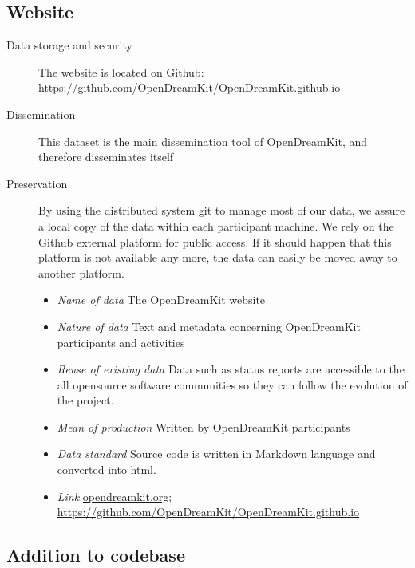 \documentclass{deliverablereport}
\begin{document}
\subsection{Website}

\begin{description}
\item[Data storage and security] The website is located on Github: \href{https://github.com/OpenDreamKit/OpenDreamKit.github.io}{https://github.com/OpenDreamKit/OpenDreamKit.github.io}
\item[Dissemination] This dataset is the main dissemination tool of OpenDreamKit, and therefore disseminates itself
\item[Preservation] By using the distributed system git to manage most of our data, we assure a local copy of the data within each participant machine. We rely on the Github external platform for public access. If it should happen that this platform is not available any more, the data can easily be moved away to another platform.
\begin{itemize}
\item\textit{Name of data} The OpenDreamKit website
\item\textit{Nature of data} Text and metadata concerning OpenDreamKit participants and activities
\item\textit{Reuse of existing data} Data such as status reports are accessible to the all opensource software communities so they can follow the evolution of the project. 
\item\textit{Mean of production} Written by OpenDreamKit participants
\item\textit{Data standard} Source code is written in Markdown language and converted into html.
\item\textit{Link} \href{http://opendreamkit.org/}{opendreamkit.org}; \href{https://github.com/OpenDreamKit/OpenDreamKit.github.io}{https://github.com/OpenDreamKit/OpenDreamKit.github.io}
\end{itemize}
\end{description}


\subsection{Addition to \GAP codebase}
\end{document}
